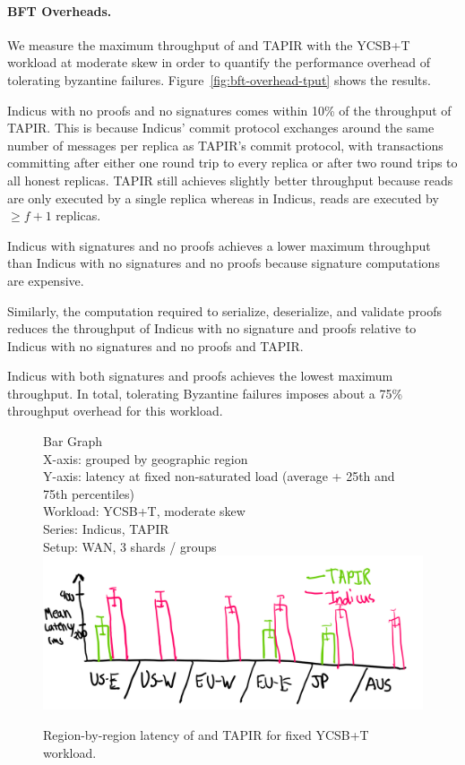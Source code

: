 \paragraph{BFT Overheads.} We measure the maximum throughput of \sys{} and TAPIR with the YCSB+T workload at moderate skew in order to quantify the performance overhead of tolerating byzantine failures.
Figure~\ref{fig:bft-overhead-tput} shows the results.

Indicus with no proofs and no signatures comes within 10\% of the throughput of
TAPIR. This is because Indicus' commit protocol exchanges around the same
number of messages per replica as TAPIR's commit protocol, with
transactions committing after either one round trip to every replica or after
two round trips to all honest replicas.  TAPIR still achieves slightly
better throughput because reads are only executed by a single replica whereas in
Indicus, reads are executed by $\geq f+1$ replicas. 


Indicus with signatures and no proofs achieves a lower maximum throughput than
Indicus with no signatures and no proofs because signature computations are
expensive.

Similarly, the computation required to serialize, deserialize, and validate
proofs reduces the throughput of Indicus with no signature and proofs relative
to Indicus with no signatures and no proofs and TAPIR.

Indicus with both signatures and proofs achieves the lowest maximum throughput.
In total, tolerating Byzantine failures imposes about a 75\% throughput overhead
for this workload.

\begin{figure}
  Bar Graph\\
  X-axis: grouped by geographic region\\
  Y-axis: latency at fixed non-saturated load (average + 25th and 75th percentiles)\\
  Workload: YCSB+T, moderate skew\\
  Series: Indicus, TAPIR\\
  Setup: WAN, 3 shards / groups\\
  \includegraphics[width=\columnwidth]{figures/eval/bft-overhead-lat.png}
  \caption{Region-by-region latency of \sys{} and TAPIR for fixed YCSB+T workload.}
  \label{fig:bft-overhead-lat}
\end{figure}

